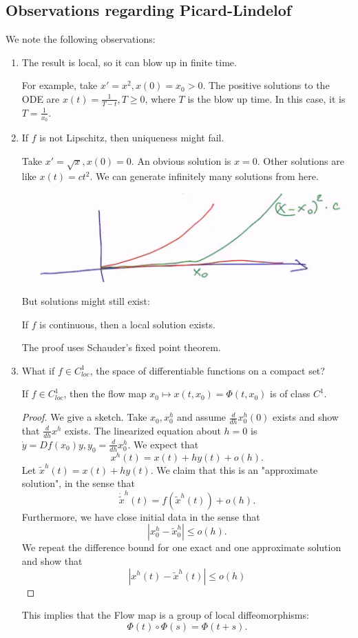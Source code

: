 \documentclass[11pt]{scrartcl}
\begin{document}
\subsection{Observations regarding Picard-Lindelof}
We note the following observations:
\begin{enumerate}
\item The result is local, so it can blow up in finite time.  

For example, take $x' = x^2, x(0) = x_0 > 0$.  The positive solutions to the ODE are $x(t) = \frac{1}{T - t}, T \ge 0$, where $T$ is the blow up time.  In this case, it is $T = \frac{1}{x_0}.$
\item If $f$ is not Lipschitz, then uniqueness might fail.

Take $x' = \sqrt{x}, x(0) = 0$.  An obvious solution is $x = 0$.  Other solutions are like $x(t) = ct^2$.  We can generate infinitely many solutions from here.
\begin{center}
\includegraphics[scale=0.5]{notunique.png}
\end{center}
But solutions might still exist:
\begin{thm}[Peano] If $f$ is continuous, then a local solution exists.
\end{thm}
The proof uses Schauder's fixed point theorem.

\item What if $f \in C_{loc}^1$, the space of differentiable functions on a compact set?
\begin{thm} If $f \in C_{loc}^1$, then the flow map $x_0 \mapsto x(t, x_0) = \Phi(t, x_0)$ is of class $C^1$. 
\end{thm}
\begin{proof}
We give a sketch.  Take $x_0, x_0^h$ and assume $\frac{d}{dh}x_0^h(0)$ exists and show that $\frac{d}{dh}x^h$ exists.  The linearized equation about $h = 0$ is $\dot{y} = Df(x_0)y, y_0 = \frac{d}{dh}x_0^h$.  We expect that $$x^h(t) = x(t) + hy(t) + o(h).$$
Let $\tilde{x}^h(t) = x(t) + hy(t)$.  We claim that this is an "approximate solution", in the sense that $$\dot{\tilde{x}}^h(t) = f(\tilde{x}^h(t)) + o(h).$$
Furthermore, we have close initial data in the sense that
$$|x_0^h - \tilde{x}_0^h| \le o(h).$$
We repeat the difference bound for one exact and one approximate solution and show that 
$$|x^h(t) - \tilde{x}^h(t)| \le o(h)$$
\end{proof}
This implies that the Flow map is a group of local diffeomorphisms:
$$\Phi(t) \circ \Phi(s) = \Phi(t+s).$$
\end{enumerate}
\end{document}
